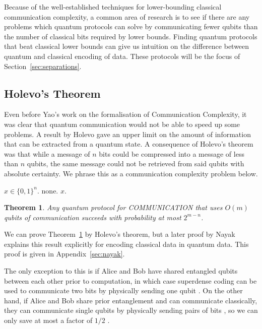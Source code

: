 \documentclass[a4paper]{article}
\newtheorem{theorem}{Theorem}[section]
\begin{document}
        Because of the well-established techniques for lower-bounding classical communication complexity, a common area of research is to see if there are any problems which quantum protocols can solve by communicating fewer qubits than the number of classical bits required by lower bounds. Finding quantum protocols that beat classical lower bounds can give us intuition on the difference between quantum and classical encoding of data. These protocols will be the focus of Section~\ref{sec:separations}.

        \subsection{Holevo's Theorem}

        Even before Yao's work on the formalisation of Communication Complexity, it was clear that quantum communication would not be able to speed up some problems. A result by Holevo \cite{Hol73} gave an upper limit on the amount of information that can be extracted from a quantum state. A consequence of Holevo's theorem was that while a message of $n$ bits could be compressed into a message of less than $n$ qubits, the same message could not be retrieved from said qubits with absolute certainty. We phrase this as a communication complexity problem below.

        \begin{codebox}
            \zi {} $x \in \{0, 1\}^n$.
            \zi {} none.
            \zi {} $x$.
        \end{codebox}

        \begin{theorem}
            \label{thm:nayak}
            Any quantum protocol for COMMUNICATION that uses $O(m)$ qubits of communication succeeds with probability at most $2^{m-n}$.
        \end{theorem}

        We can prove Theorem~\ref{thm:nayak} by Holevo's theorem, but a later proof by Nayak \cite{814608} explains this result explicitly for encoding classical data in quantum data. This proof is given in Appendix~\ref{sec:nayak}.

        The only exception to this is if Alice and Bob have shared entangled qubits between each other prior to computation, in which case superdense coding can be used to communicate two bits by physically sending one qubit \cite{PhysRevLett.69.2881}. On the other hand, if Alice and Bob share prior entanglement and can communicate classically, they can communicate single qubits by physically sending pairs of bits \cite{PhysRevLett.70.1895}, so we can only save at most a factor of $1/2$ \cite{quant-ph/0101005}.
\end{document}
